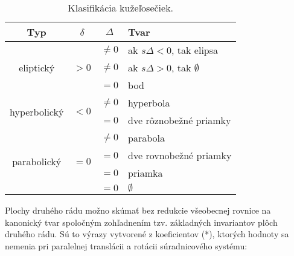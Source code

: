 \begin{table}[h]
\centering
\begin{tabular}{|c|c|c|l|}
\hline
\textbf{Typ} & $\delta$ & $\Delta$ & \textbf{Tvar}  \\
\hline
\multirow{3}{*}{eliptický} & \multirow{3}{*}{$> 0$} & $\neq 0$ & ak $s\Delta < 0$, tak elipsa \\
& & $\neq 0$ & ak $s\Delta > 0$, tak  $\emptyset$ \\
& & $= 0$ & bod \\
\hline
\multirow{2}{*}{hyperbolický} & \multirow{2}{*}{$< 0$} & $\neq0$ & hyperbola \\
 & & $=0$ & dve rôznobežné priamky \\
\hline
\multirow{4}{*}{parabolický} & \multirow{4}{*}{$= 0$} & $\neq0$ & parabola \\
& & $=0$ & dve rovnobežné priamky \\
& & $= 0$ & priamka \\
& & $= 0$ & $\emptyset$ \\
\hline
\end{tabular}
\caption{Klasifikácia kužeľosečiek.}
\label{tab:conic_sections}
\end{table}
Plochy druhého rádu možno skúmať bez redukcie všeobecnej rovnice na kanonický tvar spoločným zohľadnením tzv. základných invariantov plôch druhého rádu. Sú to výrazy vytvorené z koeficientov (*), ktorých hodnoty sa nemenia pri paralelnej translácii a rotácii súradnicového systému:

